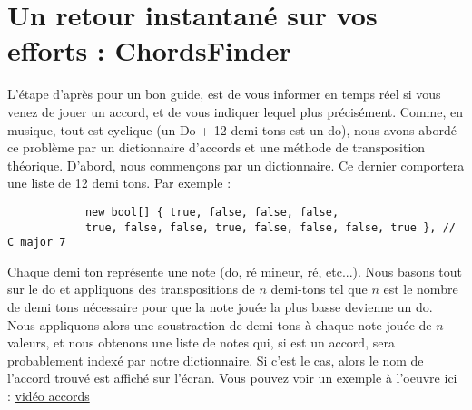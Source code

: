 \documentclass{article}
\begin{document}
\section{Un retour instantané sur vos efforts : ChordsFinder}

L'étape d'après pour un bon guide, est de vous informer en temps réel si vous venez de jouer un accord, et de vous indiquer lequel plus précisément. Comme, en musique, tout est cyclique (un Do + 12 demi tons est un do), nous avons abordé ce problème par un dictionnaire d'accords et une méthode de transposition théorique. 
\newline
\newline
D'abord, nous commençons par un dictionnaire. Ce dernier comportera une liste de 12 demi tons. Par exemple :
\begin{verbatim}
            new bool[] { true, false, false, false, 
            true, false, false, true, false, false, false, true }, // C major 7
\end{verbatim}
Chaque demi ton représente une note (do, ré mineur, ré, etc...). Nous basons tout sur le do et appliquons des transpositions de $n$ demi-tons tel que $n$ est le nombre de demi tons nécessaire pour que la note jouée la plus basse devienne un do. Nous appliquons alors une soustraction de demi-tons à chaque note jouée de $n$ valeurs, et nous obtenons une liste de notes qui, si est un accord, sera probablement indexé par notre dictionnaire. Si c'est le cas, alors le nom de l'accord trouvé est affiché sur l'écran.
\newline
\newline
Vous pouvez voir un exemple à l'oeuvre ici : \href{https://www.youtube.com/watch?v=-Vk3yYAOV_4&list=PLvsOC5PoBqO5ggNxiqPKSkO_ZL5-JctbU&index=3}{vidéo accords}
\end{document}
